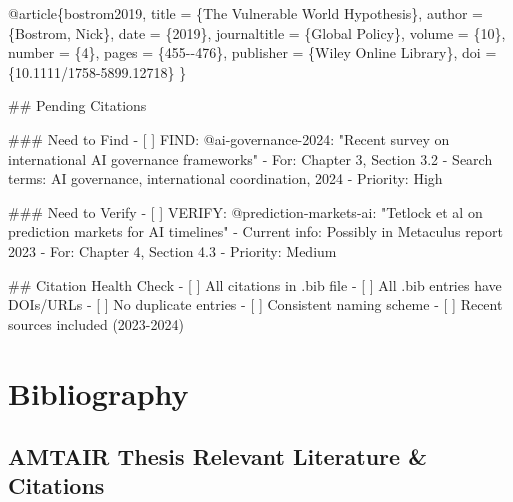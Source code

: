 \documentclass[
  11pt,
  letterpaper,
]{book}
\newenvironment{Shaded}{\begin{snugshade}}{\end{snugshade}}
\newcommand{\FunctionTok}[1]{\textcolor[rgb]{0.28,0.35,0.67}{#1}}
\newcommand{\NormalTok}[1]{\textcolor[rgb]{0.00,0.23,0.31}{#1}}
\newcommand{\SpecialStringTok}[1]{\textcolor[rgb]{0.13,0.47,0.30}{#1}}
\newcommand{\VariableTok}[1]{\textcolor[rgb]{0.07,0.07,0.07}{#1}}
\begin{document}
\begin{Shaded}
\begin{Highlighting}[]
\NormalTok{@article\{bostrom2019,}
\NormalTok{  title = \{The Vulnerable World Hypothesis\},}
\NormalTok{  author = \{Bostrom, Nick\},}
\NormalTok{  date = \{2019\},}
\NormalTok{  journaltitle = \{Global Policy\},}
\NormalTok{  volume = \{10\},}
\NormalTok{  number = \{4\},}
\NormalTok{  pages = \{455{-}{-}476\},}
\NormalTok{  publisher = \{Wiley Online Library\},}
\NormalTok{  doi = \{10.1111/1758{-}5899.12718\}}
\NormalTok{\}}




\FunctionTok{\#\# Pending Citations}

\FunctionTok{\#\#\# Need to Find}
\SpecialStringTok{{-} }\VariableTok{[ ]}\NormalTok{ FIND: @ai{-}governance{-}2024: "Recent survey on international AI governance frameworks"}
\SpecialStringTok{  {-} }\NormalTok{For: Chapter 3, Section 3.2}
\SpecialStringTok{  {-} }\NormalTok{Search terms: AI governance, international coordination, 2024}
\SpecialStringTok{  {-} }\NormalTok{Priority: High}

\FunctionTok{\#\#\# Need to Verify}
\SpecialStringTok{{-} }\VariableTok{[ ]}\NormalTok{ VERIFY: @prediction{-}markets{-}ai: "Tetlock et al on prediction markets for AI timelines"}
\SpecialStringTok{  {-} }\NormalTok{Current info: Possibly in Metaculus report 2023}
\SpecialStringTok{  {-} }\NormalTok{For: Chapter 4, Section 4.3}
\SpecialStringTok{  {-} }\NormalTok{Priority: Medium}


\FunctionTok{\#\# Citation Health Check}
\SpecialStringTok{{-} }\VariableTok{[ ]}\NormalTok{ All citations in .bib file}
\SpecialStringTok{{-} }\VariableTok{[ ]}\NormalTok{ All .bib entries have DOIs/URLs}
\SpecialStringTok{{-} }\VariableTok{[ ]}\NormalTok{ No duplicate entries}
\SpecialStringTok{{-} }\VariableTok{[ ]}\NormalTok{ Consistent naming scheme}
\SpecialStringTok{{-} }\VariableTok{[ ]}\NormalTok{ Recent sources included (2023{-}2024)}

\end{Highlighting}
\end{Shaded}


\chapter*{Bibliography}\label{bibliography}



\section{AMTAIR Thesis Relevant Literature \&
Citations}\label{amtair-thesis-relevant-literature-citations}
\end{document}

